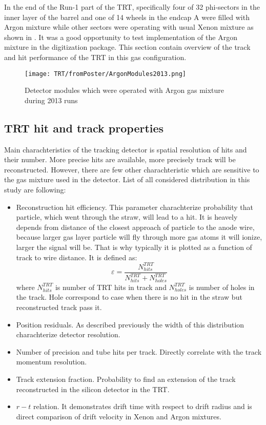 In the end of the Run-1 part of the TRT, specifically
four of 32 phi-sectors in the inner layer of the barrel and one of 14 wheels in the endcap A were filled with Argon mixture while other sectors were operating 
with usual Xenon mixture as shown in .
It was a good opportunity to test implementation of the Argon mixture in the digitization package.
This section contain overview of the track and hit performance of the TRT in this gas configuration.

\begin{figure}
\begin{center}
 \texttt{[image: TRT/fromPoster/ArgonModules2013.png]}
\caption{Detector modules which were operated with Argon gas mixture during 2013 runs}
\label{fig:argonModulesIn2013}
\end{center}
\end{figure}

\subsection{TRT hit and track properties}

Main charachteristics of the tracking detector is spatial resolution of hits and their number. 
More precise hits are available, more precisely track will be reconstructed.
However, there are few other charachteristic which are sensitive to the gas mixture used in the detector.
List of all considered distribution in this study are following:
\begin{itemize}
 \item Reconstruction hit efficiency. This parameter charachterize probability that particle, which went through the straw, will lead to a hit.
 It is heavely depends from distance of the closest approach of particle to the anode wire, because larger gas layer particle will fly through more gas atoms it will
 ionize, larger the signal will be. That is why typically it is plotted as a function of track to wire distance. It is defined as:
 \begin{equation}
  \varepsilon = \dfrac{N^{TRT}_{hits}}{N^{TRT}_{hits} + N^{TRT}_{holes}}
 \label{eq:hit_eff}
 \end{equation}
 where $N^{TRT}_{hits}$ is number of TRT hits in track and $N^{TRT}_{holes}$ is number of holes in the track. Hole correspond to case when there is no hit in the straw
 but reconstructed track pass it.
 \item Position residuals. As described previously the width of this distribution charachterize detector resolution.
 \item Number of precision and tube hits per track. Directly correlate with the track momentum resolution.
 \item Track extension fraction. Probability to find an extension of the track reconstructed in the silicon detector in the TRT.
 \item $r-t$ relation. It demonstrates drift time with respect to drift radius and is direct comparison of drift velocity in Xenon and Argon mixtures.
\end{itemize}


